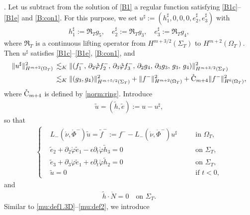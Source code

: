 \documentclass[twoside,11pt]{article}
\numberwithin{equation}{section}
\def\p{\partial}
\begin{document}
\vspace*{2mm}
.\quad
Let us subtract from the solution of \eqref{B1} a regular function satisfying \eqref{B1c}--\eqref{B1e} and \eqref{B:con1}.
For this purpose, we set $u^{\sharp}:=(h_1^{\sharp}, 0, 0, 0, e_2^{\sharp},e_3^{\sharp})$ with
\begin{align} \label{u.sharp:def}
	h_1^{\sharp}:=\mathfrak{R}_{T} g_5,\quad
	e_2^{\sharp}:=\mathfrak{R}_{T} g_3,\quad
	e_3^{\sharp}:=\mathfrak{R}_{T} g_4,
\end{align}
where $\mathfrak{R}_T$ is a continuous lifting operator from $H^{{m+3/2}}(\Sigma_T)$ to $H^{{m+2}}(\Omega_{T})$.
Then $u^{\sharp}$ satisfies \eqref{B1c}--\eqref{B1e}, \eqref{B:con1}, and
\begin{align} \nonumber
	\|u^{\sharp}\|_{H^{m+2}(\Omega_{T})}^2\, &\lesssim_K
	\|(f_1^-,\, \p_2\mathring{\varphi}f_2^- ,\,\p_3\mathring{\varphi}f_3^- ,\, \p_2 g_4,\,\p_3 g_3,\, g_3,\, g_4)\|_{H^{m+3/2}(\Sigma_T)}^2\\
	& \lesssim_K
	\| (g_3,g_4)\|_{H^{m+5/2}(\Sigma_T)}^2
	+ \|f^-\|_{H^{m+2}(\Omega_{T})}^2
	+\mathring{\rm C}_{m+4}\|f^-\|_{H^{6}(\Omega_{T})}^2,
	\label{u.sharp:es}
\end{align}
where $\mathring{\rm C}_{m+4}$ is defined by \eqref{norm:ring}.
Introduce
\begin{align} \label{u.tilde:def}
	\tilde{u}=(\tilde{h},\tilde{e}):=u-u^{\sharp},%
\end{align}
so that
\begin{align} \label{u.tilde:eq}
	\left\{
	\begin{aligned}
		&L_-(\mathring{\nu},\mathring{\Phi}^-) \tilde{u}=\tilde{f}^-
		:= f^- -L_-(\mathring{\nu},\mathring{\Phi}^-)  u^{\sharp}
		&\quad  &\textrm{in } \Omega_T,	\\
	& \tilde{e}_2+\p_2\mathring{\varphi}\tilde{e}_1-\epsilon \p_t\mathring{\varphi} \tilde{h}_3=0
&\quad  &\textrm{on } \Sigma_T,\\[0.5mm]
& \tilde{e}_3+\p_3\mathring{\varphi}\tilde{e}_1+\epsilon \p_t\mathring{\varphi} \tilde{h}_2=0
&\quad  &\textrm{on } \Sigma_T,\\[0.5mm]
		&\tilde{u}=0
		&& \textrm{if } t<0,
	\end{aligned}
	\right.
\end{align}
and
\begin{align} \label{B:con2}
	\tilde{h}\cdot \mathring{N}  =0
	\quad  \textrm{on } \Sigma_T.
\end{align}
Similar to \eqref{mu:def1.3D}--\eqref{mu:def2}, we introduce
\end{document}
